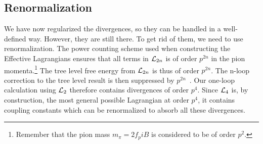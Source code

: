 \subsection{Renormalization}
We have now regularized the divergences, so they can be handled in a well-defined way.
However, they are still there.
To get rid of them, we need to use renormalization.
The power counting scheme used when constructing the Effective Lagrangians ensures that all terms in $\mathcal{L}_{2n}$ is of order $p^{2n}$ in the pion momenta.\footnote{Remember that the pion mass $m_\pi = 2 f_pi B$ is considered to be of order $p^2$.}
The tree level free energy from $\mathcal{L}_{2n}$ is thus of order $p^{2n}$.
The n-loop correction to the tree level result is then suppressed by $p^{2n}$~\cite{Gasser-Leutwyler:chiral,WeinbergPhenom}.
Our one-loop calculation using $\mathcal{L}_2$ therefore contains divergences of order $p^{4}$. 
Since $\mathcal{L}_4$ is, by construction, the most general possible Lagrangian at order $p^4$, it contains coupling constants which can be renormalized to absorb all these divergences.

